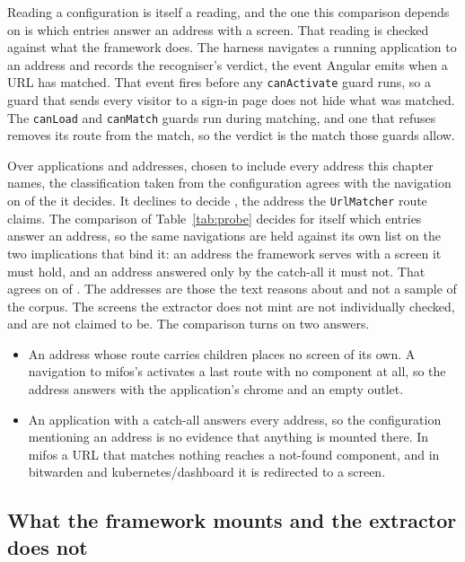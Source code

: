 Reading a configuration is itself a reading, and the one this comparison depends on is which entries answer an address with a screen. That reading is checked against what the framework does. The harness navigates a running application to an address and records the recogniser's verdict, the event Angular emits when a URL has matched. That event fires before any \texttt{canActivate} guard runs, so a guard that sends every visitor to a sign-in page does not hide what was matched. The \texttt{canLoad} and \texttt{canMatch} guards run during matching, and one that refuses removes its route from the match, so the verdict is the match those guards allow.

Over \ProbeAnswerApps{} applications and \ProbeAnswerAddresses{} addresses, chosen to include every address this chapter names, the classification taken from the configuration agrees with the navigation on \ProbeAnswerAgreed{} of the \ProbeAnswerChecked{} it decides. It declines to decide \ProbeAnswerUndecided{}, the address the \texttt{UrlMatcher} route claims. The comparison of Table~\ref{tab:probe} decides for itself which entries answer an address, so the same navigations are held against its own list on the two implications that bind it: an address the framework serves with a screen it must hold, and an address answered only by the catch-all it must not. That agrees on \ProbeCmpAgreed{} of \ProbeCmpChecked{}. The addresses are those the text reasons about and not a sample of the corpus. The \ProbeMissed{} screens the extractor does not mint are not individually checked, and are not claimed to be. The comparison turns on two answers.
\begin{itemize}
\item An address whose route carries children places no screen of its own. A navigation to mifos's  activates a last route with no component at all, so the address answers with the application's chrome and an empty outlet.
\item An application with a catch-all answers every address, so the configuration mentioning an address is no evidence that anything is mounted there. In mifos a URL that matches nothing reaches a not-found component, and in bitwarden and kubernetes/dashboard it is redirected to a screen.
\end{itemize}

\subsection{What the framework mounts and the extractor does not}

